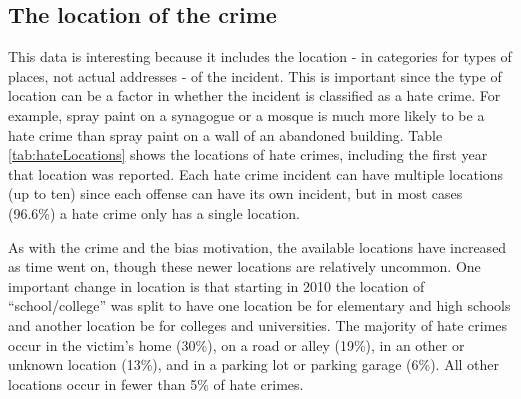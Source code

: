 \documentclass[
]{krantz}
\begin{document}
\subsection{The location of the
crime}\label{the-location-of-the-crime}

This data is interesting because it includes the location -
in categories for types of places, not actual addresses - of
the incident. This is important since the type of location
can be a factor in whether the incident is classified as a
hate crime. For example, spray paint on a synagogue or a
mosque is much more likely to be a hate crime than spray
paint on a wall of an abandoned building. Table
\ref{tab:hateLocations} shows the locations of hate crimes,
including the first year that location was reported. Each
hate crime incident can have multiple locations (up to ten)
since each offense can have its own incident, but in most
cases (96.6\%) a hate crime only has a single location.

As with the crime and the bias motivation, the available
locations have increased as time went on, though these newer
locations are relatively uncommon. One important change in
location is that starting in 2010 the location of
``school/college'' was split to have one location be for
elementary and high schools and another location be for
colleges and universities. The majority of hate crimes occur
in the victim's home (30\%), on a road or alley (19\%), in
an other or unknown location (13\%), and in a parking lot or
parking garage (6\%). All other locations occur in fewer
than 5\% of hate crimes.
\end{document}
